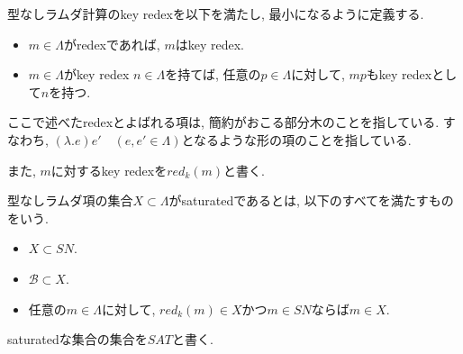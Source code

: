\documentclass[12pt]{ltjsarticle}
\begin{document}
\begin{defn}
 型なしラムダ計算のkey redexを以下を満たし, 最小になるように定義する.
 \begin{itemize}
  \item $m \in \Lambda$がredexであれば, $m$はkey redex.
  \item $m \in \Lambda$がkey redex $n \in \Lambda$を持てば, 任意の$p \in \Lambda$に対して, $m p$もkey redexとして$n$を持つ.
 \end{itemize}
ここで述べたredexとよばれる項は, 簡約がおこる部分木のことを指している. すなわち, $(\lambda. e) e' \quad (e, e' \in \Lambda)$となるような形の項のことを指している.
 
また, $m$に対するkey redexを$red_k(m)$と書く.
\end{defn}

\begin{defn}\label{ss}
 型なしラムダ項の集合$X \subset \Lambda$がsaturatedであるとは, 以下のすべてを満たすものをいう.
 \begin{itemize}
  \item $X \subset SN$.
  \item $\mathcal{B} \subset X$.
  \item 任意の$m \in \Lambda$に対して, $red_k(m) \in X$かつ$m \in SN$ならば$m \in X$.
 \end{itemize}
 saturatedな集合の集合を$SAT$と書く.
\end{defn}
\end{document}
